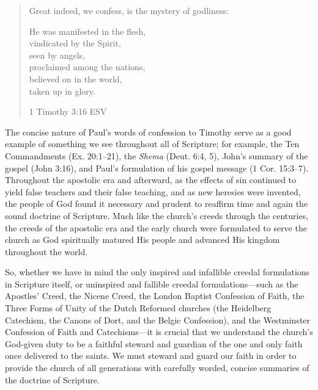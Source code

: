 \medskip

\begin{quote}
    
Great indeed, we confess, is the mystery of godliness:
\begin{center}
      He was manifested in the flesh,\\
         vindicated by the Spirit,\\
           seen by angels,\\
      proclaimed among the nations,\\
         believed on in the world,\\
           taken up in glory.
\end{center}
\begin{flushright}
1 Timothy 3:16 ESV
\end{flushright}
\end{quote}

The concise nature of Paul’s words of confession to Timothy serve as a good example of something we see throughout all of Scripture; for example, the Ten Commandments (Ex. 20:1–21), the \textit{Shema} (Deut. 6:4, 5), John’s summary of the gospel (John 3:16), and Paul’s formulation of his gospel message (1 Cor. 15:3–7). Throughout the apostolic era and afterward, as the effects of sin continued to yield false teachers and their false teaching, and as new heresies were invented, the people of God found it necessary and prudent to reaffirm time and again the sound doctrine of Scripture. Much like the church’s creeds through the centuries, the creeds of the apostolic era and the early church were formulated to serve the church as God spiritually matured His people and advanced His kingdom throughout the world.

\medskip

So, whether we have in mind the only inspired and infallible creedal formulations in Scripture itself, or uninspired and fallible creedal formulations—such as the Apostles’ Creed, the Nicene Creed, the London Baptist Confession of Faith, the Three Forms of Unity of the Dutch Reformed churches (the Heidelberg Catechism, the Canons of Dort, and the Belgic Confession), and the Westminster Confession of Faith and Catechisms—it is crucial that we understand the church’s God-given duty to be a faithful steward and guardian of the one and only faith once delivered to the saints. We must steward and guard our faith in order to provide the church of all generations with carefully worded, concise summaries of the doctrine of Scripture.

